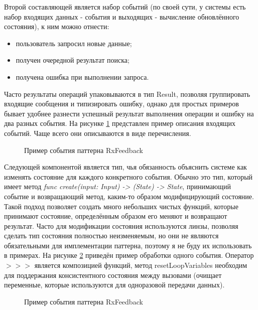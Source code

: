 Второй составляющей является набор событий (по своей сути, у системы есть набор входящих данных - события и выходящих - вычисление обновлённого состояния), к ним можно отнести:

\begin{itemize}
  \item пользователь запросил новые данные;
  \item получен очередной результат поиска;
  \item получена ошибка при выполнении запроса.
\end{itemize}

Часто результаты операций упаковываются в тип Result, позволяя группировать входящие сообщения и типизировать ошибку, однако для простых примеров бывает удобнее разнести успешный результат выполнения операции и ошибку на два разных события. На рисунке \ref{sec:development:arch:ios:rxfeedback:example:event} представлен пример описания входящих событий. Чаще всего они описываются в виде перечисления.

\begin{figure}[h]
  
   \caption{Пример события паттерна RxFeedback}
   \label{sec:development:arch:ios:rxfeedback:example:event}
\end{figure}

Следующей компонентой является тип, чья обязанность объяснить системе как изменять состояние для каждого конкретного события. Обычно это тип, который имеет метод \textit{func create(input: Input) -> (State) -> State}, принимающий событие и возвращающий метод, каким-то образом модифицирующий состояние. Такой подход позволяет создать много небольших чистых функций, которые принимают состояние, определённым образом его меняют и возвращают результат. Часто для модификации состояния используются линзы, позволяя сделать тип состояния полностью неизменяемым, но они не являются обязательными для имплементации паттерна, поэтому я не буду их использовать в примерах. На рисунке \ref{sec:development:arch:ios:rxfeedback:example:mutator} приведён пример обработки одного события. Оператор \(>>>\) является композицией функций, метод resetLoopVariables необходим для поддержания консистентного состояния между вызовами (очищает переменные, которые используются для одноразовой передачи данных).

\begin{figure}[h]
  
   \caption{Пример события паттерна RxFeedback}
   \label{sec:development:arch:ios:rxfeedback:example:mutator}
\end{figure}

